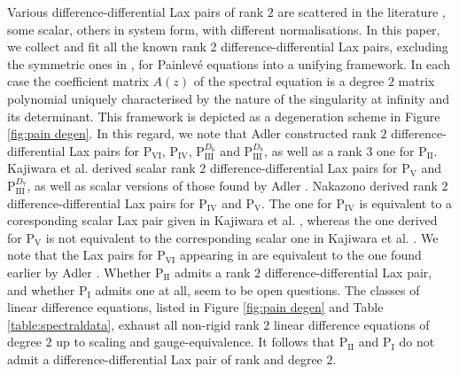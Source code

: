 \documentclass[a4paper,reqno]{amsart}
\numberwithin{equation}{section}
\numberwithin{figure}{section}
\theoremstyle{remark}
\newcommand\Pone{\textrm{P}_{\textrm{I}} }
\newcommand\Ptwo{\textrm{P}_{\textrm{II}} }
\newcommand\Pthree{\textrm{P}_{\textrm{III}}}
\newcommand\Pfour{\textrm{P}_{\textrm{IV}}}
\newcommand\Pfive{\textrm{P}_{\textrm{V}}}
\newcommand\Psix{\textrm{P}_{\textrm{VI}}}
\begin{document}
Various difference-differential Lax pairs of rank $2$ are scattered in the literature \cites{adler94,nakazono_lax,KNY2017,ormerodrains2017}, some scalar, others in system form, with different normalisations.
In this paper, we collect and fit all the known rank 2 difference-differential Lax pairs, excluding the symmetric ones in \cite{ormerodrains2017},
for Painlev\'e equations into a unifying framework. In each case the coefficient matrix $A(z)$ of the spectral equation is a degree $2$ matrix polynomial uniquely characterised by the nature of the singularity at infinity and its determinant.
This framework is depicted as a degeneration scheme in Figure \ref{fig:pain degen}.
In this regard, we note that Adler \cite{adler94} constructed rank $2$ difference-differential Lax pairs for $\Psix$, $\Pfour$, $\Pthree^{D_6}$ and $\Pthree^{D_8}$, as well as a rank $3$ one for $\Ptwo$.
Kajiwara et al. \cite{KNY2017} derived scalar rank $2$ difference-differential Lax pairs for $\Pfive$ and $\Pthree^{D_7}$, as well as scalar versions of those found by Adler \cite{adler94}.
Nakazono \cite{nakazono_lax} derived rank $2$ difference-differential Lax pairs for $\Pfour$ and $\Pfive$. The one for $\Pfour$ is equivalent to a coresponding scalar Lax pair given in Kajiwara et al. \cite{KNY2017}, whereas the one derived for $\Pfive$ is not equivalent to the corresponding scalar one in Kajiwara et al. \cite{KNY2017}.
We note that the Lax pairs for $\Psix$ appearing in \cite{ormerodrains2017,arinkinbor2006} are equivalent to the one found earlier by Adler \cite{adler94}. 
Whether $\Ptwo$ admits a rank $2$ difference-differential Lax pair, and whether $\Pone$ admits one at all, seem to be open questions. The classes of linear difference equations, listed in Figure \ref{fig:pain degen} and Table \ref{table:spectraldata}, exhaust all non-rigid rank $2$ linear difference equations of degree $2$ up to scaling and gauge-equivalence.  It follows that $\Ptwo$ and $\Pone$ do not admit a difference-differential Lax pair of rank and degree $2$.
\end{document}
